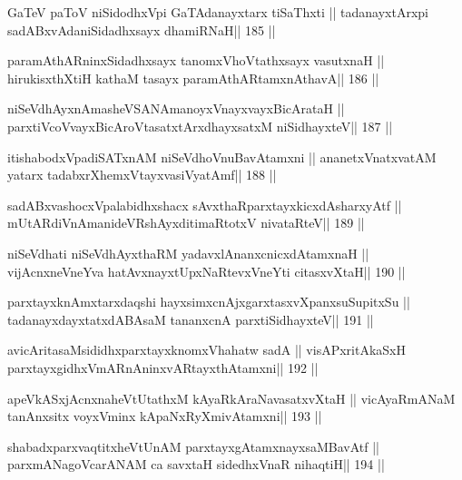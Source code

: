 \begin{shl}
GaTeV paToV niSidodhxV\s pi GaTAdanayxtarx tiSaThxti ||
tadanayxtArxpi sadABxvAdaniSidadhxsayx dhamiRNaH\hfill || 185 ||
\end{shl}

\begin{shl}
paramAthARninxSidadhxsayx tanomxVhoVtathxsayx vasutxnaH ||
hirukisxthXtiH kathaM tasayx paramAthARtamxnA\s thavA\hfill || 186 ||
\end{shl}

\begin{shl}
niSeVdhAyxnAmasheVSANAmanoyxVnayxvayxBicArataH ||
parxtiVcoV\s vayxBicAroV\s tasatxtArxdhayxsatxM niSidhayxteV\hfill || 187 ||
\end{shl}

\begin{shl}
itishabodxVpadiSATxnAM niSeVdhoV\s nuBavAtamxni ||
ananetxV\s natxvatAM yatarx tadabxrXhemxVtayxvasiVyatAmf\hfill || 188 ||
\end{shl}

\begin{shl}
sadABxvashocxVpalabidhxshacx sAvxthaRparxtayxkicxdAsharxyAtf ||
mUtARdiVnAmanideVRshAyxditimaRtotxV nivataRteV\hfill || 189 ||
\end{shl}

\begin{shl}
niSeVdhati niSeVdhAyxthaRM yadavxlAnanxcnicxdAtamxnaH ||
vijAcnxneVneYva hatAvx\s nayxtUpxNaRtevxVneYti citasxvXtaH\hfill || 190 ||
\end{shl}

\begin{shl}
parxtayxknAmxtarxdaqshi hayxsimxcnAjxgarxtasxvXpanxsuSupitxSu ||
tadanayxdayxtatxdABAsaM tananxcnA parxtiSidhayxteV\hfill || 191 ||
\end{shl}

\begin{shl}
avicAritasaMsididhxparxtayxknomxVhahatw sadA ||
visAPxritAkaSxH parxtayxgidhxVmARnAninxvARtayxthA\s\s tamxni\hfill || 192 ||
\end{shl}

\begin{shl}
apeVkASxjAcnxnaheVtUtathxM kAyaRkAraNavasatxvXtaH ||
vicAyaRmANaM tanAnxsitx voyxVminx kApaNxRyXmivA\s\s tamxni\hfill || 193 ||
\end{shl}

\begin{shl}
shabadxparxvaqtitxheVtUnAM parxtayxgAtamxnayxsaMBavAtf ||
parxmANagoVcarANAM ca savxtaH sidedhxVnaR nihaqtiH\hfill || 194 ||
\end{shl}

